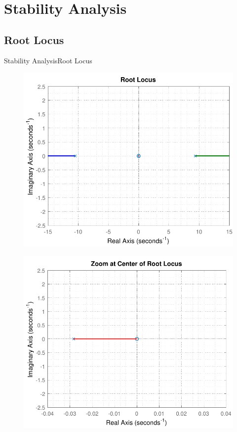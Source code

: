 
\section{Stability Analysis}

\subsection{Root Locus}
\begin{frame}{Stability Analysis}{Root Locus}
\begin{minipage}{\linewidth}
	\begin{minipage}{0.45\linewidth}
		\begin{figure}
			\includegraphics[scale=.42]{Pictures/rlocusCubli}
			\centering
		\end{figure}
	\end{minipage}
	\hspace{0.1\linewidth}
	\begin{minipage}{0.45\linewidth}
		\begin{figure}[H]
			\includegraphics[scale=.35]{Pictures/rlocusCubliZoom}

\end{figure}
\end{minipage}
\end{minipage}
\end{frame}
